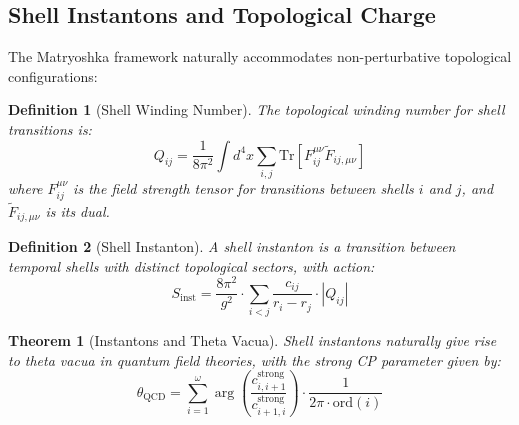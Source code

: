 \documentclass[12pt,a4paper]{article}
\newtheorem{theorem}{Theorem}[section]
\newtheorem{definition}{Definition}[section]
\newcommand{\ord}{\text{ord}}
\begin{document}
\subsection{Shell Instantons and Topological Charge}
\label{subsec:shell-instantons}

The Matryoshka framework naturally accommodates non-perturbative topological configurations:

\begin{definition}[Shell Winding Number]
\label{def:winding-number}
The topological winding number for shell transitions is:
\begin{equation}
Q_{ij} = \frac{1}{8\pi^2}\int d^4x \sum_{i,j} \text{Tr}[F_{ij}^{\mu\nu}\tilde{F}_{ij,\mu\nu}]
\end{equation}
where $F_{ij}^{\mu\nu}$ is the field strength tensor for transitions between shells $i$ and $j$, and $\tilde{F}_{ij,\mu\nu}$ is its dual.
\end{definition}

\begin{definition}[Shell Instanton]
\label{def:shell-instanton}
A shell instanton is a transition between temporal shells with distinct topological sectors, with action:
\begin{equation}
S_{\text{inst}} = \frac{8\pi^2}{g^2} \cdot \sum_{i < j} \frac{c_{ij}}{r_i - r_j} \cdot |Q_{ij}|
\end{equation}
\end{definition}

\begin{theorem}[Instantons and Theta Vacua]
\label{thm:instantons-theta}
Shell instantons naturally give rise to theta vacua in quantum field theories, with the strong CP parameter given by:
\begin{equation}
\theta_{\text{QCD}} = \sum_{i=1}^{\omega} \arg\left(\frac{c_{i,i+1}^{\text{strong}}}{c_{i+1,i}^{\text{strong}}}\right) \cdot \frac{1}{2\pi \cdot \ord(i)}
\end{equation}
\end{theorem}
\end{document}
